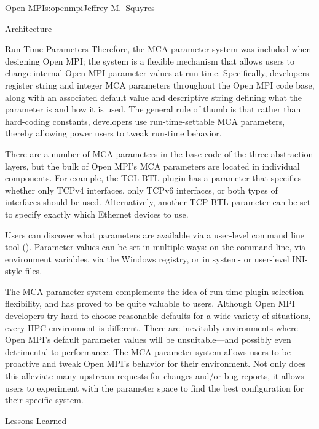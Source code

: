 \begin{aosachapter}{Open MPI}{s:openmpi}{Jeffrey M.\ Squyres}
\begin{aosasect1}{Architecture}
\begin{aosasect2}{Run-Time Parameters}
Therefore, the MCA parameter system was included when designing Open
MPI; the system is a flexible mechanism that allows users to change internal Open
MPI parameter values at run time.
%
Specifically, developers register string and integer MCA parameters
throughout the Open MPI code base, along with an associated default
value and descriptive string defining what the parameter is and how it
is used.
%
The general rule of thumb is that rather than hard-coding constants,
developers use run-time-settable MCA parameters, thereby allowing
power users to tweak run-time behavior.

There are a number of MCA parameters in the base code of the three
abstraction layers, but the bulk of Open MPI's MCA parameters are
located in individual components.
%
For example, the TCL BTL plugin has a parameter that specifies whether
only TCPv4 interfaces, only TCPv6 interfaces, or both types of
interfaces should be used.
%
Alternatively, another TCP BTL parameter can be set to specify
exactly which Ethernet devices to use.

Users can discover what parameters are available via a user-level
command line tool ().
%
Parameter values can be set in multiple ways: on the command line, via
environment variables, via the Windows registry, or in system- or
user-level INI-style files.

The MCA parameter system complements the idea of run-time plugin
selection flexibility, and has proved to be quite valuable to users.
%
Although Open MPI developers try hard to choose reasonable defaults
for a wide variety of situations, every HPC environment is different.
There are inevitably environments where Open MPI's default parameter
values will be unsuitable---and possibly even detrimental to
performance.
%
The MCA parameter system allows users to be proactive and tweak Open
MPI's behavior for their environment.  Not only does this alleviate
many upstream requests for changes and/or bug reports, it allows users
to experiment with the parameter space to find the best configuration
for their specific system.

\end{aosasect2}

\end{aosasect1}


\begin{aosasect1}{Lessons Learned}


\end{aosasect1}
\end{aosachapter}
